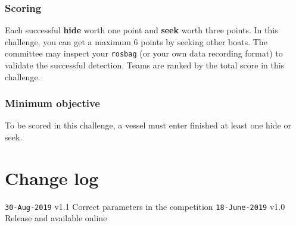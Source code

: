 \documentclass[12pt]{article}
\begin{document}
\subsubsection{Scoring}

Each successful \textbf{hide} worth one point and \textbf{seek} worth three points.
In this challenge, you can get a maximum 6 points by seeking other boats.
The committee may inspect your \texttt{rosbag} (or your own data recording format) to validate the successful detection. 
Teams are ranked by the total score in this challenge.


\subsubsection{Minimum objective}
To be scored in this challenge, a vessel must enter finished at least one hide or seek. 


\section*{Change log}

\texttt{30-Aug-2019} v1.1 Correct parameters in the competition
\texttt{18-June-2019} v1.0 Release and available online
\end{document}

